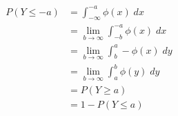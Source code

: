 \documentclass[a4paper]{article}
\begin{document}
\begin{enumerate}
\begin{enumerate}
\begin{align*}
	P(Y \leq -a) &= \int_{-\infty}^{-a} \phi(x) \; dx\\
	&= \lim_{b \to \infty} \int_{-b}^{-a} \phi(x) \; dx\\
	&= \lim_{b \to \infty} \int_b^a - \phi(x) \; dy\\
	&= \lim_{b \to \infty} \int_a^b \phi(y) \; dy\\
	&= P(Y \geq a)\\
	&= 1 - P(Y \leq a)
\end{align*}



\end{enumerate}



	
	


\end{enumerate}
\end{document}
